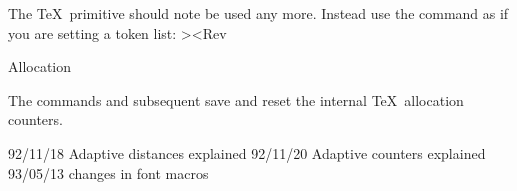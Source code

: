  \>

 

The \TeX\ primitive  should note be used any more.
Instead use the command  as if you are setting
a token list:
 \Ver><Rev

\SubSection Allocation

The commands  and subsequent  save and
reset the internal \TeX\ allocation counters.

92/11/18 Adaptive distances explained
92/11/20 Adaptive counters explained
93/05/13 changes in font macros
